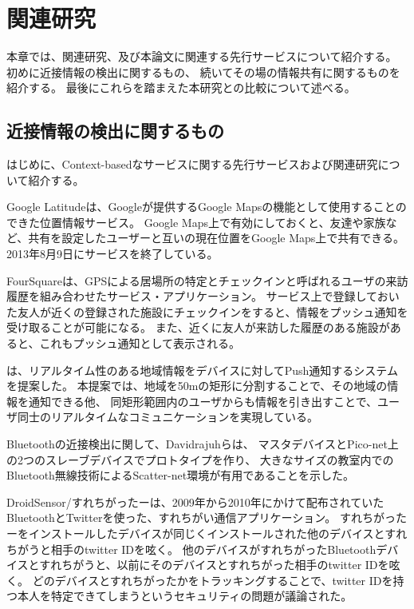 \chapter{関連研究}\label{chap:related}

本章では、関連研究、及び本論文に関連する先行サービスについて紹介する。
初めに近接情報の検出に関するもの、
続いてその場の情報共有に関するものを紹介する。
最後にこれらを踏まえた本研究との比較について述べる。

\newpage

\section{近接情報の検出に関するもの}

はじめに、Context-basedなサービスに関する先行サービスおよび関連研究について紹介する。

Google Latitude\cite{latitude}は、Googleが提供するGoogle Mapsの機能として使用することのできた位置情報サービス。
Google Maps上で有効にしておくと、友達や家族など、共有を設定したユーザーと互いの現在位置をGoogle Maps上で共有できる。
2013年8月9日にサービスを終了している。

FourSquare\cite{foursquare}は、GPSによる居場所の特定とチェックインと呼ばれるユーザの来訪履歴を組み合わせたサービス・アプリケーション。
サービス上で登録しておいた友人が近くの登録された施設にチェックインをすると、情報をプッシュ通知を受け取ることが可能になる。
また、近くに友人が来訪した履歴のある施設があると、これもプッシュ通知として表示される。

\cite{槙島量:2010-03-08}は、リアルタイム性のある地域情報をデバイスに対してPush通知するシステムを提案した。
本提案では、地域を50mの矩形に分割することで、その地域の情報を通知できる他、
同矩形範囲内のユーザからも情報を引き出すことで、ユーザ同士のリアルタイムなコミュニケーションを実現している。

Bluetoothの近接検出に関して、Davidrajuh\cite{Davidrajuh:2009:EPB:1523492.1523495}らは、
マスタデバイスとPico-net上の2つのスレーブデバイスでプロトタイプを作り、
大きなサイズの教室内でのBluetooth無線技術によるScatter-net環境が有用であることを示した。

DroidSensor/すれちがったー\cite{すれちがったー}は、2009年から2010年にかけて配布されていたBluetoothとTwitterを使った、すれちがい通信アプリケーション。
すれちがったーをインストールしたデバイスが同じくインストールされた他のデバイスとすれちがうと相手のtwitter IDを呟く。
他のデバイスがすれちがったBluetoothデバイスとすれちがうと、以前にそのデバイスとすれちがった相手のtwitter IDを呟く。
どのデバイスとすれちがったかをトラッキングすることで、twitter IDを持つ本人を特定できてしまうというセキュリティの問題が議論された。


